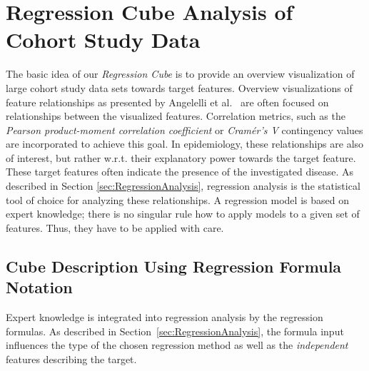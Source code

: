 \documentclass[journal]{style/vgtc} 			          %
\begin{document}
\section{Regression Cube Analysis of Cohort Study Data}
The basic idea of our \emph{Regression Cube} is to provide an overview visualization of large cohort study data sets towards target features.
Overview visualizations of feature relationships as presented by Angelelli et al.~\cite{Angelelli} are often focused on relationships between the visualized features.
Correlation metrics, such as the \emph{Pearson product-moment correlation coefficient} or \emph{Cram\'{e}r's V} contingency values are incorporated to achieve this goal.
In epidemiology, these relationships are also of interest, but rather w.r.t. their explanatory power towards the target feature.
These target features often indicate the presence of the investigated disease.
As described in Section \ref{sec:RegressionAnalysis}, regression analysis is the statistical tool of choice for analyzing these relationships.
A regression model is based on expert knowledge; there is no singular rule how to apply models to a given set of features. Thus, they have to be applied with care.
\subsection{Cube Description Using Regression Formula Notation}
Expert knowledge is integrated into regression analysis by the regression formulas.
As described in Section~\ref{sec:RegressionAnalysis}, the formula input influences the type of the chosen regression method as well as the \emph{independent} features describing the target.
\end{document}

